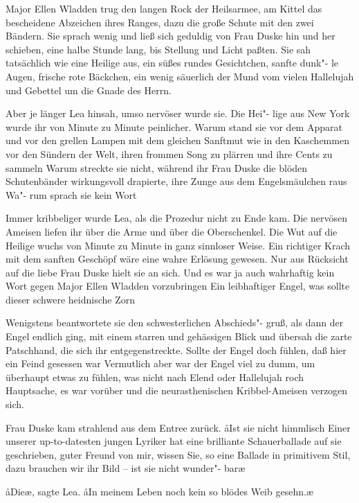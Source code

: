 Major Ellen Wladden\label{lS63-3} trug den langen Rock der Heilsarmee, am
Kittel das bescheidene Abzeichen ihres Ranges\label{lS63-4}, dazu die große
Schute mit den zwei Bändern. Sie sprach wenig und ließ sich
geduldig von Frau Duske hin und her schieben, eine halbe
Stunde\label{lS63-5} lang, bis Stellung und Licht paßten\label{lS63-6}. Sie sah tatsächlich
wie eine Heilige aus, ein süßes rundes Gesichtchen, sanfte dunk"-%
le Augen\label{lS63-7}, frische rote Bäckchen, ein wenig säuerlich der Mund
vom vielen Hallelujah und Gebettel um die Gnade des Herrn.

Aber je länger Lea hinsah, umso nervöser wurde sie. Die Hei"-%
lige aus New York wurde ihr von Minute zu Minute peinlicher.
Warum stand sie vor dem Apparat und vor den grellen
Lampen mit dem gleichen Sanftmut wie in den Kaschemmen
vor den Sündern der Welt, ihren frommen Song zu plärren
und ihre Cents zu sammeln\frag{} Warum streckte sie nicht, während
ihr Frau Duske die blöden Schutenbänder wirkungsvoll
drapierte, ihre Zunge aus dem Engelsmäulchen raus\frag{} Wa"-%
rum sprach sie kein Wort\frag{}

Immer kribbeliger wurde Lea, als die Prozedur nicht zu Ende
kam. Die nervösen Ameisen liefen ihr über die Arme und über
die Oberschenkel. Die Wut auf die Heilige wuchs von Minute
zu Minute in ganz sinnloser Weise. Ein richtiger Krach mit
dem sanften Geschöpf wäre eine wahre Erlösung gewesen.
Nur aus Rücksicht auf die liebe Frau Duske hielt sie an sich.
Und es war ja auch wahrhaftig kein Wort gegen Major Ellen
Wladden vorzubringen\frag{} Ein leibhaftiger Engel, was sollte
dieser schwere heidnische Zorn\frag{}

Wenigstens beantwortete sie den schwesterlichen Abschieds"-%
gruß, als dann der Engel endlich ging, mit einem starren und
gehässigen Blick und übersah die zarte Patschhand, die sich ihr
entgegenstreckte. Sollte der Engel doch fühlen, daß hier ein
Feind gesessen war\ausr{} Vermutlich aber war der Engel viel zu
dumm, um überhaupt etwas zu fühlen, was nicht nach Elend
oder Hallelujah roch\frag{} Hauptsache, es war vorüber und die
neurasthenischen Kribbel-Ameisen verzogen sich.

Frau Duske kam strahlend aus dem Entree zurück. \aa{}Ist sie
nicht himmlisch\frag{} Einer unserer up-to-datesten jungen Lyriker
hat eine brilliante Schauerballade auf sie geschrieben, guter
Freund von mir, wissen Sie, so eine Ballade in primitivem
Stil, dazu brauchen wir ihr Bild -- ist sie nicht wunder"-%
bar\frag{}\ae{}

\aa{}Die\frag{}\ae{}, sagte Lea. \aa{}In meinem Leben noch kein so blödes
Weib gesehn.\ae{}

